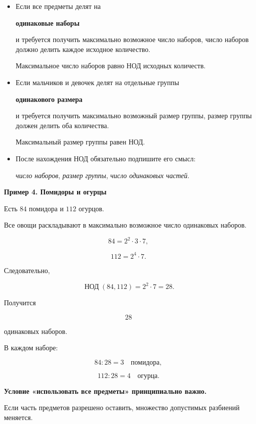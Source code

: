 \documentclass[a4paper,12pt]{article}
\newcommand{\mygcd}[2]{
  \mathop{\text{НОД}}\nolimits(#1,#2)
}
\newcommand{\term}[1]{
  \textbf{\textcolor{darkaccent}{#1}}
}
\newcommand{\exampletitle}[1]{
  \medskip
  \textbf{\textcolor{accent}{#1}}
  \par
  \smallskip
}
\begin{document}
\begin{itemize}

  \item
  Если все предметы делят на
  \term{одинаковые наборы}
  и требуется получить максимально возможное число наборов,
  число наборов должно делить каждое исходное количество.

  Максимальное число наборов равно НОД
  исходных количеств.

  \item
  Если мальчиков и девочек делят
  на отдельные группы
  \term{одинакового размера}
  и требуется получить максимально возможный размер группы,
  размер группы должен делить оба количества.

  Максимальный размер группы равен НОД.

  \item
  После нахождения НОД обязательно подпишите его смысл:

  \begin{center}
  \emph{число наборов},
  \qquad
  \emph{размер группы},
  \qquad
  \emph{число одинаковых частей}.
  \end{center}

\end{itemize}

\exampletitle{
Пример 4. Помидоры и огурцы
}

Есть $84$ помидора и $112$ огурцов.

Все овощи раскладывают
в максимально возможное число одинаковых наборов.

\[
84=2^2\cdot3\cdot7,
\]

\[
112=2^4\cdot7.
\]

Следовательно,

\[
\mygcd{84}{112}
=
2^2\cdot7
=
28.
\]

Получится

\[
28
\]

одинаковых наборов.

В каждом наборе:

\[
84:28=3
\quad
\text{помидора},
\]

\[
112:28=4
\quad
\text{огурца}.
\]

\textbf{
Условие «использовать все предметы»
принципиально важно.
}

Если часть предметов разрешено оставить,
множество допустимых разбиений меняется.

\end{document}
